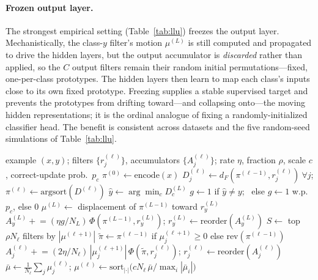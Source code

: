 \documentclass[12pt]{article}
\newcommand{\argsort}{\mathrm{argsort}}
\begin{document}
\paragraph{Frozen output layer.}
The strongest empirical setting (Table~\ref{tab:llu}) freezes the output layer. Mechanistically, the class-$y$ filter's motion $\mu^{(L)}$ is still computed and propagated to drive the hidden layers, but the output accumulator is \emph{discarded} rather than applied, so the $C$ output filters remain their random initial permutations---fixed, one-per-class prototypes. The hidden layers then learn to map each class's inputs close to its own fixed prototype. Freezing supplies a stable supervised target and prevents the prototypes from drifting toward---and collapsing onto---the moving hidden representations; it is the ordinal analogue of fixing a randomly-initialized classifier head. The benefit is consistent across datasets and the five random-seed simulations of Table~\ref{tab:llu}.

\begin{algorithm}[t]
\caption{Supervised training step (one example, sort-only network)}
\label{alg:supervised}
\begin{algorithmic}[1]
\Require example $(x,y)$; filters $\{r^{(\ell)}_j\}$, accumulators $\{A^{(\ell)}_j\}$; rate $\eta$, fraction $\rho$, scale $c$, correct-update prob.\ $p_c$
\State $\pi^{(0)} \gets \mathrm{encode}(x)$
 
  \State $D^{(\ell)}_j \gets d_F(\pi^{(\ell-1)}, r^{(\ell)}_j)\ \forall j$; \quad $\pi^{(\ell)} \gets \argsort(D^{(\ell)})$
\EndFor
\State $\hat{y} \gets \arg\min_c D^{(L)}_c$
\State $g \gets 1$ if $\hat{y} \neq y$; \ else $g \gets 1$ w.p.\ $p_c$, else $0$ 
\State $\mu^{(L)} \gets$ displacement of $\pi^{(L-1)}$ toward $r^{(L)}_y$ 
  \State $A^{(L)}_y \mathrel{+}= (\eta g / N_L)\,\Phi(\pi^{(L-1)}, r^{(L)}_y)$; \quad $r^{(L)}_y \gets \mathrm{reorder}(A^{(L)}_y)$
\EndIf
{} 
  \State $S \gets$ top $\rho N_\ell$ filters by $|\mu^{(\ell+1)}|$
     \State $\tilde{\pi} \gets \pi^{(\ell-1)}$ if $\mu^{(\ell+1)}_j \ge 0$ else $\mathrm{rev}(\pi^{(\ell-1)})$ 
     \State $A^{(\ell)}_j \mathrel{+}= (2\eta/N_\ell)\,|\mu^{(\ell+1)}_j|\,\Phi(\tilde{\pi}, r^{(\ell)}_j)$; \quad $r^{(\ell)}_j \gets \mathrm{reorder}(A^{(\ell)}_j)$
  \EndFor
  \State $\bar{\mu} \gets \tfrac{1}{N_\ell}\sum_j \mu^{(\ell)}_j$; \quad $\mu^{(\ell)} \gets \mathrm{sort}_{|\cdot|}\!\big(c N_\ell\,\bar{\mu}/\max_i|\bar{\mu}_i|\big)$
\EndFor
\end{algorithmic}
\end{algorithm}
\end{document}
